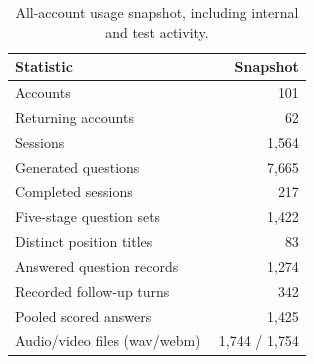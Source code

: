 \begin{table}[t]\centering\small
\begin{tabular}{@{}p{0.67\linewidth}r@{}}
\toprule
\textbf{Statistic} & \textbf{Snapshot} \\
\midrule
Accounts & 101 \\
Returning accounts & 62 \\
Sessions & 1{,}564 \\
Generated questions & 7{,}665 \\
Completed sessions & 217 \\
Five-stage question sets & 1{,}422 \\
Distinct position titles & 83 \\
Answered question records & 1{,}274 \\
Recorded follow-up turns & 342 \\
Pooled scored answers & 1{,}425 \\
Audio/video files (wav/webm) & 1{,}744 / 1{,}754 \\
\bottomrule
\end{tabular}
\caption{All-account usage snapshot, including internal and test activity.}
\label{tab:deploy}
\end{table}
